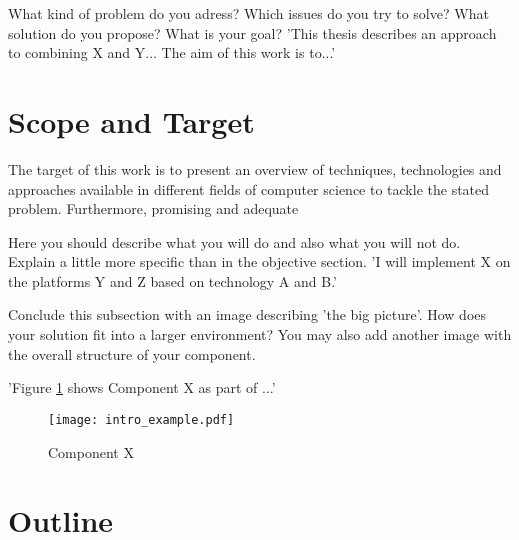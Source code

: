 What kind of problem do you adress? Which issues do you try to solve? What solution do you propose? What is your goal?
'This thesis describes an approach to combining X and Y... The aim of this work is to...'

\section{Scope and Target\label{sec:scope}}

The target of this work is to present an overview of techniques, technologies and approaches available in different fields of computer science to tackle the stated problem. Furthermore, promising and adequate    

Here you should describe what you will do and also what you will not do. Explain a little more specific than in the objective section. 'I will implement X on the platforms Y and Z based on technology A and B.'

Conclude this subsection with an image describing 'the big picture'. How does your solution fit into a larger environment? You may also add another image with the overall structure of your component.

'Figure \ref{fig:intro} shows Component X as part of ...' 
\\
\begin{figure}[htb]
  \centering
  \texttt{[image: intro\_example.pdf]}\\
  \caption{Component X}\label{fig:intro}
\end{figure}

\section{Outline\label{sec:outline}}

